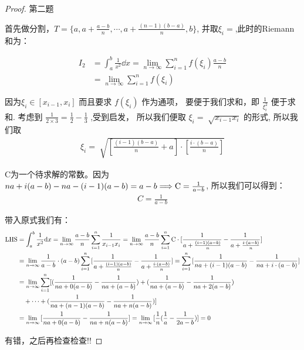 \begin{proof}\textsf{第二题}

首先做分割，$T=\{a, a+\frac{a-b}{n}, \cdots, a+\frac{(n-1)(b-a)}{n}, b\}$, 并取$\xi_i=$,此时的Riemann和为：

\begin{align*}
    I_2 
    & = \int_{a}^{b}{\frac{1}{x^2} \dd x}
        = \lim_{n\to\infty}{\sum_{i=1}^{n}{f(\xi_i)\frac{a-b}{n}}}\\
    & = \lim_{n\to\infty}{\sum_{i=1}^{n}{f(\xi_i)}}
\end{align*}
    
因为$\xi_i\in [x_{i-1}, x_i]$ 而且要求 $f(\xi_i)$ 作为通项，
要便于我们求和，即 $\frac{1}{\xi_i^2}$ 便于求和.
考虑到 $\frac{1}{2\times 3}=\frac{1}{2}-\frac{1}{3}$ ,受到启发，
所以我们便取 $\xi_i=\sqrt[]{x_{i-1}x_i}$ 的形式, 所以我们取
\begin{align*}
    \xi_i=\sqrt[]{[\frac{(i-1)(b-a)}{n}+a]\cdot[\frac{i\cdot(b-a)}{n}]}
\end{align*} 


C为一个待求解的常数。因为 $na+i(a-b)-na-(i-1)(a-b)=a-b\Longrightarrow {\rm C}=\frac{1}{a-b}$, 所以我们可以得到：
\begin{align*}
    C = \frac{1}{a-b}
\end{align*}

带入原式我们有：
\begin{align*}
    \mathrm{LHS} 
    & = \int_{a}^{b}{ \frac{1}{x^2}\mathrm{d} x}=\lim_{n\to\infty}{\frac{a-b}{n}\sum_{i=1}^{n}{\frac{1}{x_{i-1}x_i}}}
      = \lim_{n\to\infty}{\frac{a-b}{n}\sum_{i=1}^{n}{{\rm C}\cdot[\frac{1}{a+\frac{(i-1)(a-b)}{n}}-\frac{1}{a+\frac{i\cdot(a-b)}{n}}]}}\\
    & = \lim_{n\to\infty}{\frac{1}{a-b}\cdot (a-b)\sum_{i=1}^{n}{[\frac{1}{a+\frac{(i-1)(a-b)}{n}}-\frac{1}{a+\frac{i\cdot(a-b)}{n}}]}}
      = \sum_{i=1}^{n}{[\frac{1}{na+(i-1)(a-b)}-\frac{1}{na+i\cdot(a-b)}]}\\
    & = \lim_{n\to\infty}\sum_{i=1}^{n}[(\frac{1}{na+0(a-b)}-\frac{1}{na+(a-b)})+(\frac{1}{na+(a-b)}-\frac{1}{na+2(a-b)})\\
    & \quad+\cdots+(\frac{1}{na+(n-1)(a-b)}-\frac{1}{na+n(a-b)})]\\
    & = \lim_{n\to\infty}{[\frac{1}{na+0(a-b)}-\frac{1}{na+n(a-b)}]}
      =\lim_{n\to\infty}{[\frac{1}{n}(\frac{1}{a}-\frac{1}{2a-b})]} = 0
\end{align*} 

有错，之后再检查检查!!
\end{proof}